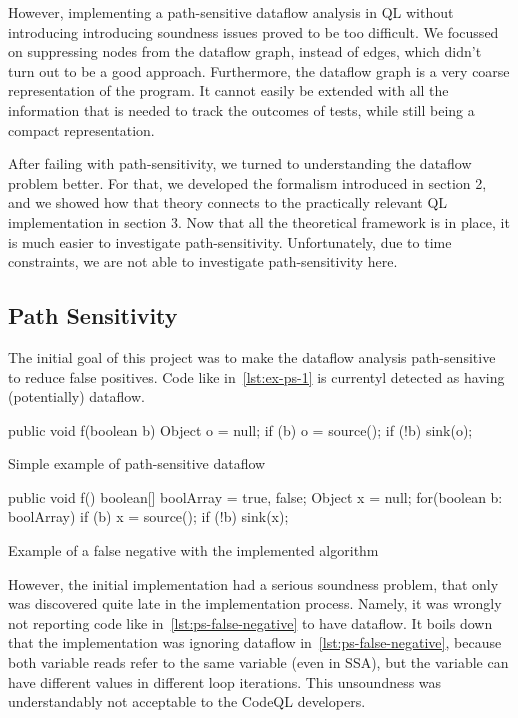 However, implementing a path-sensitive dataflow analysis in QL without introducing
introducing soundness issues proved to be too difficult.
We focussed on suppressing nodes from the dataflow graph, instead of edges,
which didn't turn out to be a good approach.
Furthermore, the dataflow graph is a very coarse representation of the program.
It cannot easily be extended with all the information that is needed to track the outcomes
of tests, while still being a compact representation.

After failing with path-sensitivity, we turned to understanding the dataflow problem better.
For that, we developed the formalism introduced in section 2, and we showed how that
theory connects to the practically relevant QL implementation in section 3.
Now that all the theoretical framework is in place, it is much easier to investigate path-sensitivity.
Unfortunately, due to time constraints, we are not able to investigate path-sensitivity here.


\iffalse
\subsection{Path Sensitivity}
The initial goal of this project was to make the dataflow analysis path-sensitive
to reduce false positives. Code like in~\autoref{lst:ex-ps-1} is currentyl detected 
as having (potentially) dataflow.

\begin{listing}[h]
    \begin{javacode}
public void f(boolean b) {
    Object o = null;
    if (b) {
        o = source();
    }
    if (!b) {
        sink(o);
    }
}
    \end{javacode}
    \caption{Simple example of path-sensitive dataflow}
    \label{lst:ex-ps-1}
\end{listing}

\begin{listing}[h]
    \begin{javacode}
public void f() {
    boolean[] boolArray = {true, false};
    Object x = null;
    for(boolean b: boolArray) {
        if (b) {
            x = source();
        }
        if (!b) {
            sink(x);
        }
    }
}
    \end{javacode}
    \caption{Example of a false negative with the implemented algorithm}
    \label{lst:ps-false-negative}
\end{listing}

However, the initial implementation had a serious soundness problem, that only was discovered
quite late in the implementation process.
Namely, it was wrongly not reporting code like in~\autoref{lst:ps-false-negative} to have dataflow.
It boils down that the implementation was ignoring dataflow in~\autoref{lst:ps-false-negative},
because both variable reads refer to the same variable (even in SSA), but the 
variable can have different values in different loop iterations.
This unsoundness was understandably not acceptable to the CodeQL developers.

